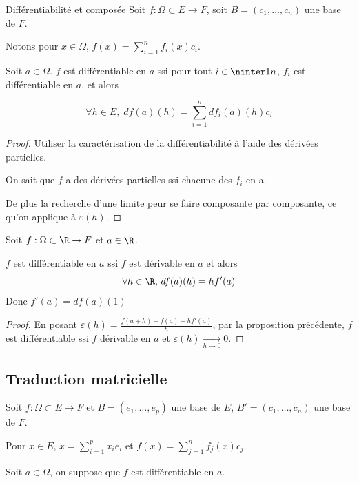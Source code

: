 \begin{proposition}{Différentiabilité et composée}{}
    Soit $f : \Omega \subset E \to F$, soit $B = (c_1, \ldots, c_n)$ une base de $F$.

    Notons pour $x \in \Omega$, $\displaystyle f(x) = \sum_{i = 1 }^{n } f_i(x) c_i$.

    Soit $a \in \Omega$. $f$ est différentiable en $a$ ssi pour 
    tout $i \in \ninter 1 n$, $f_i$ est différentiable en $a$, et alors 

    $$\forall h \in E, \; \displaystyle df(a)(h) = \sum_{i = 1 }^{n } df_i(a)(h) c_i$$
\end{proposition}

\begin{proof}
    Utiliser la caractérisation de la différentiabilité à l'aide des dérivées partielles.

    On sait que $f$ a des dérivées partielles ssi chacune des $f_i$ en a. 

    De plus la recherche d'une limite peur se faire composante par composante, ce qu'on applique 
    à $\varepsilon(h)$.
\end{proof}

\begin{proposition}{}{}
    Soit $f : \Omega \subset \R \to F$ et $a \in \R$. 

    $f$ est différentiable en $a$ ssi $f$ est dérivable en $a$ et alors 
    $$\forall h \in \R, \, df(a)(h) = h f'(a)$$ Donc $f'(a) = df(a)(1)$
\end{proposition}

\begin{proof}
    En posant $\varepsilon(h) = \displaystyle \frac{f(a + h) - f(a) - h f'(a)}{h}$, par la 
    proposition précédente, $f$ est différentiable ssi $f$ dérivable en $a$ et $\varepsilon(h) \xrightarrow[h \to 0 ]{} 0$.
\end{proof}

\subsection{Traduction matricielle }


Soit $f : \Omega \subset E \to F$ et $B = (e_1, \ldots, e_p)$ une base de $E$,
$B' = (c_1, \ldots, c_n)$ une base de $F$.

Pour $x \in E$, $\displaystyle x = \sum_{i = 1 }^{p } x_i e_i$ et 
$\displaystyle f(x) = \sum_{j = 1 }^{n } f_j(x) c_j$.

Soit $a \in \Omega$, on suppose que $f$ est différentiable en $a$. 

